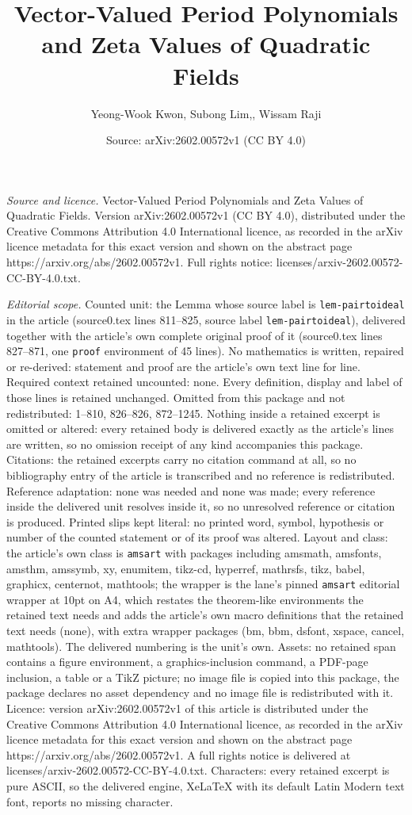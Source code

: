 \documentclass[10pt,a4paper]{amsart}
\title[Vector-Valued Period Polynomials and Zeta Values of Quadrati]{Vector-Valued Period Polynomials and Zeta Values of Quadratic Fields}
\author{Yeong-Wook Kwon, Subong Lim,, Wissam Raji}
\date{Source: arXiv:2602.00572v1 (CC BY 4.0)}
\begin{document}
\maketitle

\noindent\emph{Source and licence.} Vector-Valued Period Polynomials and Zeta Values of Quadratic Fields. Version arXiv:2602.00572v1 (CC BY 4.0), distributed under the Creative Commons Attribution 4.0 International licence, as recorded in the arXiv licence metadata for this exact version and shown on the abstract page https://arxiv.org/abs/2602.00572v1. Full rights notice: licenses/arxiv-2602.00572-CC-BY-4.0.txt.\par\smallskip

\noindent\textit{Editorial scope.} Counted unit: the Lemma whose source label is \texttt{lem-pairtoideal} in the article (source0.tex lines 811--825, source label \texttt{lem-pairtoideal}), delivered together with the article's own complete original proof of it (source0.tex lines 827--871, one \texttt{proof} environment of 45 lines). No mathematics is written, repaired or re-derived: statement and proof are the article's own text line for line. Required context retained uncounted: none. Every definition, display and label of those lines is retained unchanged. Omitted from this package and not redistributed: 1--810, 826--826, 872--1245. Nothing inside a retained excerpt is omitted or altered: every retained body is delivered exactly as the article's lines are written, so no omission receipt of any kind accompanies this package. Citations: the retained excerpts carry no citation command at all, so no bibliography entry of the article is transcribed and no reference is redistributed. Reference adaptation: none was needed and none was made; every reference inside the delivered unit resolves inside it, so no unresolved reference or citation is produced. Printed slips kept literal: no printed word, symbol, hypothesis or number of the counted statement or of its proof was altered. Layout and class: the article's own class is \texttt{amsart} with packages including amsmath, amsfonts, amsthm, amssymb, xy, enumitem, tikz-cd, hyperref, mathrsfs, tikz, babel, graphicx, centernot, mathtools; the wrapper is the lane's pinned \texttt{amsart} editorial wrapper at 10pt on A4, which restates the theorem-like environments the retained text needs and adds the article's own macro definitions that the retained text needs (none), with extra wrapper packages (bm, bbm, dsfont, xspace, cancel, mathtools). The delivered numbering is the unit's own. Assets: no retained span contains a figure environment, a graphics-inclusion command, a PDF-page inclusion, a table or a TikZ picture; no image file is copied into this package, the package declares no asset dependency and no image file is redistributed with it. Licence: version arXiv:2602.00572v1 of this article is distributed under the Creative Commons Attribution 4.0 International licence, as recorded in the arXiv licence metadata for this exact version and shown on the abstract page https://arxiv.org/abs/2602.00572v1. A full rights notice is delivered at licenses/arxiv-2602.00572-CC-BY-4.0.txt. Characters: every retained excerpt is pure ASCII, so the delivered engine, XeLaTeX with its default Latin Modern text font, reports no missing character.
\end{document}
